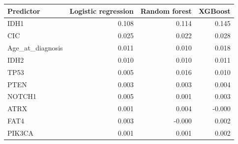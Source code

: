 \begin{tabular}{lrrr}
\toprule
\textbf{Predictor} & \textbf{Logistic regression} & \textbf{Random forest} & \textbf{XGBoost} \\
\midrule
IDH1 & 0.108 & 0.114 & 0.145 \\
CIC & 0.025 & 0.022 & 0.028 \\
Age\_at\_diagnosis & 0.011 & 0.010 & 0.018 \\
IDH2 & 0.010 & 0.010 & 0.011 \\
TP53 & 0.005 & 0.016 & 0.010 \\
PTEN & 0.003 & 0.003 & 0.004 \\
NOTCH1 & 0.005 & 0.001 & 0.003 \\
ATRX & 0.001 & 0.004 & -0.000 \\
FAT4 & 0.003 & -0.000 & 0.002 \\
PIK3CA & 0.001 & 0.001 & 0.002 \\
\bottomrule
\end{tabular}
